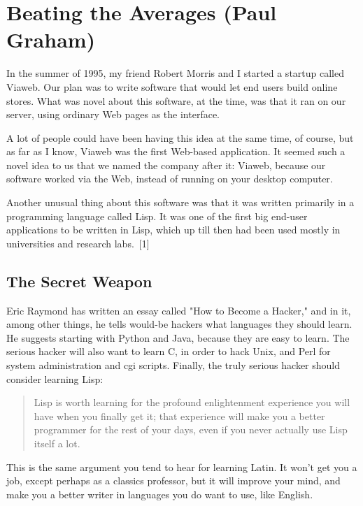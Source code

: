 \documentclass[10pt,twoside,openright]{memoir}
\begin{document}
\pagestyle{empty}


\chapter{Beating the Averages (Paul Graham)}

In the summer of 1995, my friend Robert Morris and I started a startup called Viaweb. Our plan was to write software that would let end users build online stores. What was novel about this software, at the time, was that it ran on our server, using ordinary Web pages as the interface.

A lot of people could have been having this idea at the same time, of course, but as far as I know, Viaweb was the first Web-based application. It seemed such a novel idea to us that we named the company after it: Viaweb, because our software worked via the Web, instead of running on your desktop computer.

Another unusual thing about this software was that it was written primarily in a programming language called Lisp. It was one of the first big end-user applications to be written in Lisp, which up till then had been used mostly in universities and research labs.~[1]

\section{The Secret Weapon}

Eric Raymond has written an essay called "How to Become a Hacker," and in it, among other things, he tells would-be hackers what languages they should learn. He suggests starting with Python and Java, because they are easy to learn. The serious hacker will also want to learn C, in order to hack Unix, and Perl for system administration and cgi scripts. Finally, the truly serious hacker should consider learning Lisp:

\begin{quote}
Lisp is worth learning for the profound enlightenment experience you will have when you finally get it; that experience will make you a better programmer for the rest of your days, even if you never actually use Lisp itself a lot.
\end{quote}

This is the same argument you tend to hear for learning Latin. It won't get you a job, except perhaps as a classics professor, but it will improve your mind, and make you a better writer in languages you do want to use, like English.
\end{document}
